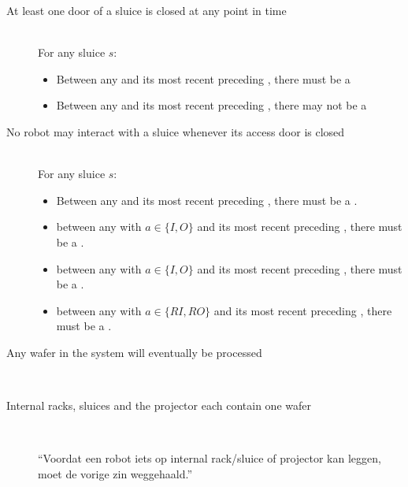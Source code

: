 
\begin{description}
 \item[At least one door of a sluice is closed at any point in time] \hfill \\
 For any sluice $s$:
 \begin{itemize}
  \item Between any  and its most recent preceding , there must be a 
  \item Between any  and its most recent preceding , there may not be a 
 \end{itemize}

 \item[No robot may interact with a sluice whenever its access door is closed] \hfill \\
For any sluice $s$:

\begin{itemize}
	\item Between any  and its most recent preceding , there must be a .
	\item between any  with $a \in \{ I, O \}$ and its most recent preceding , there must be a .
	\item between any  with $a \in \{ I, O \}$ and its most recent preceding , there must be a .
	\item between any  with $a \in \{ RI, RO \}$ and its most recent preceding , there must be a .
\end{itemize}
 
 \item[Any wafer in the system will eventually be processed] \hfill \\
 
 
 
 \item[Internal racks, sluices and the projector each contain one wafer] \hfill \\
 
 ``Voordat een robot iets op internal rack/sluice of projector kan leggen, moet de vorige zin weggehaald.''
 

\end{description}
